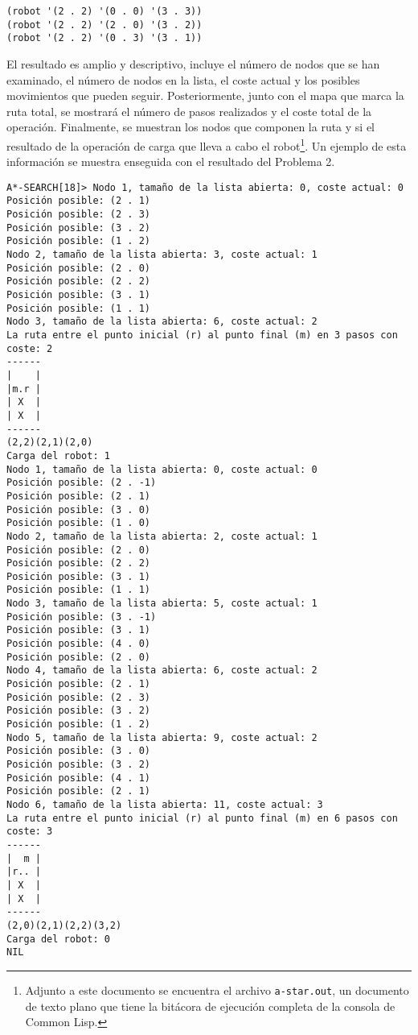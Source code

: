 \documentclass[a4paper,12pt]{article}
\begin{document}
\lstset{language=Lisp,label= ,caption= ,captionpos=b,numbers=none,numbers=left}
\begin{lstlisting}
(robot '(2 . 2) '(0 . 0) '(3 . 3))
(robot '(2 . 2) '(2 . 0) '(3 . 2))
(robot '(2 . 2) '(0 . 3) '(3 . 1))
\end{lstlisting}

El resultado es amplio y descriptivo, incluye el número de nodos que se han examinado, el número de nodos en la lista, el coste actual y los posibles movimientos que pueden seguir. Posteriormente, junto con el mapa que marca la ruta total, se mostrará el número de pasos realizados y el coste total de la operación. Finalmente, se muestran los nodos que componen la ruta y si el resultado de la operación de carga que lleva a cabo el robot\footnote{Adjunto a este documento se encuentra el archivo \texttt{a-star.out}, un documento de texto plano que tiene la bitácora de ejecución completa de la consola de Common Lisp.}. Un ejemplo de esta información se muestra enseguida con el resultado del Problema 2.

\lstset{language=sh,label= ,caption= ,captionpos=b,numbers=none,style=consola}
\begin{lstlisting}
A*-SEARCH[18]> Nodo 1, tamaño de la lista abierta: 0, coste actual: 0
Posición posible: (2 . 1)
Posición posible: (2 . 3)
Posición posible: (3 . 2)
Posición posible: (1 . 2)
Nodo 2, tamaño de la lista abierta: 3, coste actual: 1
Posición posible: (2 . 0)
Posición posible: (2 . 2)
Posición posible: (3 . 1)
Posición posible: (1 . 1)
Nodo 3, tamaño de la lista abierta: 6, coste actual: 2
La ruta entre el punto inicial (r) al punto final (m) en 3 pasos con coste: 2
------
|    |
|m.r |
| X  |
| X  |
------
(2,2)(2,1)(2,0)
Carga del robot: 1
Nodo 1, tamaño de la lista abierta: 0, coste actual: 0
Posición posible: (2 . -1)
Posición posible: (2 . 1)
Posición posible: (3 . 0)
Posición posible: (1 . 0)
Nodo 2, tamaño de la lista abierta: 2, coste actual: 1
Posición posible: (2 . 0)
Posición posible: (2 . 2)
Posición posible: (3 . 1)
Posición posible: (1 . 1)
Nodo 3, tamaño de la lista abierta: 5, coste actual: 1
Posición posible: (3 . -1)
Posición posible: (3 . 1)
Posición posible: (4 . 0)
Posición posible: (2 . 0)
Nodo 4, tamaño de la lista abierta: 6, coste actual: 2
Posición posible: (2 . 1)
Posición posible: (2 . 3)
Posición posible: (3 . 2)
Posición posible: (1 . 2)
Nodo 5, tamaño de la lista abierta: 9, coste actual: 2
Posición posible: (3 . 0)
Posición posible: (3 . 2)
Posición posible: (4 . 1)
Posición posible: (2 . 1)
Nodo 6, tamaño de la lista abierta: 11, coste actual: 3
La ruta entre el punto inicial (r) al punto final (m) en 6 pasos con coste: 3
------
|  m |
|r.. |
| X  |
| X  |
------
(2,0)(2,1)(2,2)(3,2)
Carga del robot: 0
NIL
\end{lstlisting}
\end{document}
